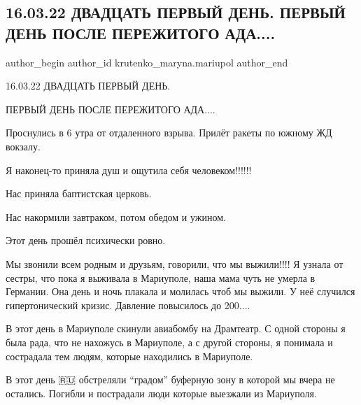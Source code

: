  
 
 
 
 

\subsection{16.03.22 ДВАДЦАТЬ ПЕРВЫЙ ДЕНЬ. ПЕРВЫЙ ДЕНЬ ПОСЛЕ ПЕРЕЖИТОГО АДА....}
\label{sec:16_03_2023.fb.krutenko_maryna.mariupol.1.21_den_16_03_pervyj_den_posle_ada}

\ifcmt
 author_begin
   author_id krutenko_maryna.mariupol
 author_end
\fi

16.03.22 ДВАДЦАТЬ ПЕРВЫЙ ДЕНЬ.

ПЕРВЫЙ ДЕНЬ ПОСЛЕ ПЕРЕЖИТОГО АДА....

Проснулись в 6 утра от отдаленного взрыва. Прилёт ракеты по южному ЖД вокзалу.

Я наконец-то приняла душ и ощутила себя человеком!!!!!!

Нас приняла баптистская церковь. 

Нас накормили завтраком, потом обедом и ужином. 

Этот день прошёл психически ровно.

Мы звонили всем родным и друзьям, говорили, что мы выжили!!!! Я узнала от
сестры, что пока я выживала в Мариуполе, наша мама чуть не умерла в Германии.
Она день и ночь плакала и молилась чтоб мы выжили. У неё случился
гипертонический кризис. Давление повысилось до 200....

В этот день в Мариуполе скинули авиабомбу на Драмтеатр. С одной стороны я была
рада, что не нахожусь в Мариуполе, а с другой стороны, я понимала и сострадала
тем людям, которые находились в Мариуполе. 


В этот день 🇷🇺 обстреляли \enquote{градом} буферную зону в которой мы вчера не
остались. Погибли и пострадали люди которые выезжали из Мариуполя.

